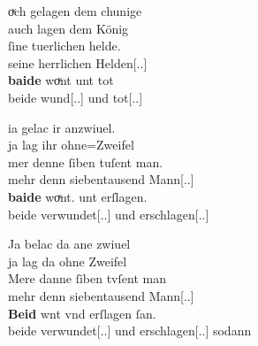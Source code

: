 \begin{exe}
\ex \label{ex:konjadjvvbeide}
    \begin{xlist}
	\ex \label{ex:konjadjvvbeide_1} %
		\gll oͮch gelagen dem chunige \\
			auch lagen dem König \\
	\sn \gll ſine tuerlichen helde. \\
			seine herrlichen Helden[\Nom.\Pl.\MascM] \\
	\sn \gll \textbf{baide} woͮnt unt tot \\
			beide wund[\Nom.\Pl.\MascM] und tot[\Nom.\Pl.\MascM] \\
		\begin{taggedline}{\parencites[\pno~67\vb, 35--36]{kc:A1}[vgl.][15880--15882]{schroeder1895}}
			\trans {}
		\end{taggedline}
	
	\ex \label{ex:konjadjvvbeide_2} %
		\begin{taggedline}{\parencites[\pno~72\ra, 32--34]{kc:A1}[vgl.][16891--16893]{schroeder1895}}
		\gll ia gelac ir anzwiuel. \\
			ja lag ihr ohne=Zweifel \\
	\sn \gll mer denne {ſiben tuſent} man. \\
			mehr denn siebentausend Mann[\Nom.\Pl.\MascM] \\
	\sn \gll \textbf{baide} woͮnt. unt erſlagen. \\
			beide verwundet[\Nom.\Pl.\MascM] und erschlagen[\Nom.\Pl.\MascM] \\
		\end{taggedline}
	
	\ex \label{ex:konjadjvvbeide_3} %
		\gll Ja belac da ane zwiuel \\
			ja lag da ohne Zweifel \\
	\sn \gll Mere danne {ſiben tvſent} man \\
			mehr denn siebentausend Mann[\Nom.\Pl.\MascM] \\
	\sn \gll \textbf{Beid} wnt vnd erſlagen ſan. \\
			beide verwundet[\Nom.\Pl.\MascM] und erschlagen[\Nom.\Pl.\MascM]
			sodann \\
		\begin{taggedline}{\parencites[\pno~110\va, 9--11]{kc:VB}[vgl.][16891--16893]{schroeder1895}}
		\trans {}
		\end{taggedline}


\end{xlist}
\end{exe}

